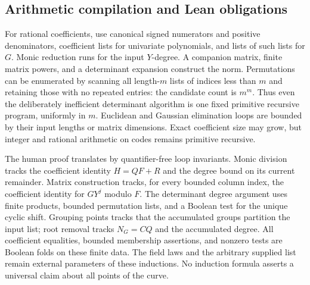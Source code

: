 \subsection{Arithmetic compilation and Lean obligations}

For rational coefficients, use canonical signed numerators and
positive denominators, coefficient lists for univariate polynomials,
and lists of such lists for $G$. Monic reduction runs for the
input $Y$-degree. A companion matrix, finite matrix powers, and a
determinant expansion construct the norm. Permutations can be
enumerated by scanning all length-$m$ lists of indices less than
$m$ and retaining those with no repeated entries: the candidate
count is $m^m$. Thus even the deliberately inefficient determinant
algorithm is one fixed primitive recursive program, uniformly in
$m$. Euclidean and Gaussian elimination loops are bounded by
their input lengths or matrix dimensions. Exact coefficient size
may grow, but integer and rational arithmetic on codes remains
primitive recursive.

The human proof translates by quantifier-free loop invariants.
Monic division tracks the coefficient identity
$H=QF+R$ and the degree bound on its current remainder. Matrix
construction tracks, for every bounded column index, the
coefficient identity for $GY^j$ modulo $F$. The determinant
degree argument uses finite products, bounded permutation lists,
and a Boolean test for the unique cyclic shift. Grouping points
tracks that the accumulated groups partition the input list;
root removal tracks $N_G=CQ$ and the accumulated degree. All
coefficient equalities, bounded membership assertions, and
nonzero tests are Boolean folds on these finite data. The field
laws and the arbitrary supplied list remain external parameters
of these inductions. No induction formula asserts a universal
claim about all points of the curve.

